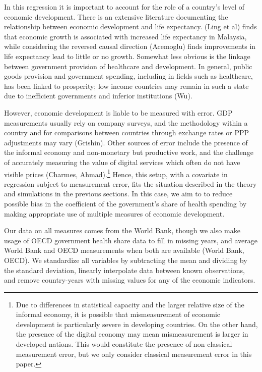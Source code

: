 \documentclass[12pt]{article}
\begin{document}
        In this regression it is important to account for the role of a country's level of economic development. There is an extensive literature documenting the relationship between economic development and life expectancy. (Ling et al) finds that economic growth is associated with increased life expectancy in Malaysia, while considering the reversed causal direction (Acemoglu) finds improvements in life expectancy lead to little or no growth. Somewhat less obvious is the linkage between government provision of healthcare and development. In general, public goods provision and government spending, including in fields such as healthcare, has been linked to prosperity; low income countries may remain in such a state due to inefficient governments and inferior institutions (Wu).

        However, economic development is liable to be measured with error. GDP measurements usually rely on company surveys, and the methodology within a country and for comparisons between countries through exchange rates or PPP adjustments may vary (Grishin). Other sources of error include the presence of the informal economy and non-monetary but productive work, and the challenge of accurately measuring the value of digital services which often do not have visible prices (Charmes, Ahmad).\footnote{Due to differences in statistical capacity and the larger relative size of the informal economy, it is possible that mismeasurement of economic development is particularly severe in developing countries. On the other hand, the presence of the digital economy may mean mismeasurement is larger in developed nations. This would constitute the presence of non-classical measurement error, but we only consider classical measurement error in this paper.} Hence, this setup, with a covariate in regression subject to measurement error, fits the situation described in the theory and simulations in the previous sections. In this case, we aim to to reduce possible bias in the coefficient of the government's share of health spending by making appropriate use of multiple measures of economic development.

        Our data on all measures comes from the World Bank, though we also make usage of OECD government health share data to fill in missing years, and average World Bank and OECD measurements when both are available (World Bank, OECD). We standardize all variables by subtracting the mean and dividing by the standard deviation, linearly interpolate data between known observations, and remove country-years with missing values for any of the economic indicators.
\end{document}
